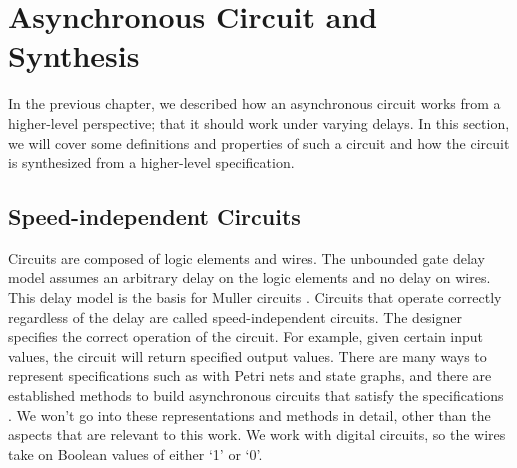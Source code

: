\documentclass[12pt]{report}
\begin{document}



\section{Asynchronous Circuit and Synthesis}
In the previous chapter, we described how an asynchronous circuit works from a higher-level perspective; that it should work under varying delays. In this section, we will cover some definitions and properties of such a circuit and how the circuit is synthesized from a higher-level specification.  

\subsection{Speed-independent Circuits}
Circuits are composed of logic elements and wires. The unbounded gate delay model assumes an arbitrary delay on the logic elements and no delay on wires.  This delay model is the basis for Muller circuits \cite{Muller_59}.  Circuits that operate correctly regardless of the delay are called speed-independent circuits. The designer specifies the correct operation of the circuit.  For example, given certain input values, the circuit will return specified output values. 
There are many ways to represent specifications such as with Petri nets and state graphs, and there are established methods to build asynchronous circuits that satisfy the specifications \cite{myers_book_2004}. We won't go into these representations and methods in detail, other than the aspects that are relevant to this work. We work with digital circuits, so the wires take on Boolean values of either `1' or `0'.\\
\end{document}
